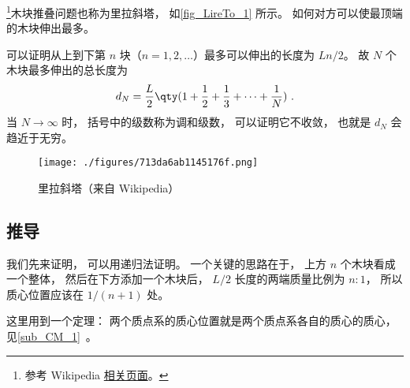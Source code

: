 
\begin{issues}
\issueDraft
\end{issues}


\footnote{参考 Wikipedia \href{https://en.wikipedia.org/wiki/Block-stacking_problem}{相关页面}。}木块推叠问题也称为里拉斜塔， 如\autoref{fig_LireTo_1} 所示。 如何对方可以使最顶端的木块伸出最多。

可以证明从上到下第 $n$ 块（$n=1,2,\dots$）最多可以伸出的长度为 $Ln/2$。 故 $N$ 个木块最多伸出的总长度为
\begin{equation}
d_N = \frac{L}{2}\qty(1 + \frac{1}{2} + \frac{1}{3} + \dots + \frac{1}{N})~.
\end{equation}
当 $N\to\infty$ 时， 括号中的级数称为调和级数，%
可以证明它不收敛， 也就是 $d_N$ 会趋近于无穷。

\begin{figure}[ht]
\centering
\texttt{[image: ./figures/713da6ab1145176f.png]}
\caption{里拉斜塔（来自 Wikipedia）} \label{fig_LireTo_1}
\end{figure}

\subsection{推导}
我们先来证明，   可以用递归法证明。  一个关键的思路在于， 上方 $n$ 个木块看成一个整体， 然后在下方添加一个木块后， $L/2$ 长度的两端质量比例为 $n:1$， 所以质心位置应该在 $1/(n+1)$ 处。

这里用到一个定理： 两个质点系的质心位置就是两个质点系各自的质心的质心， 见\autoref{sub_CM_1}~。


